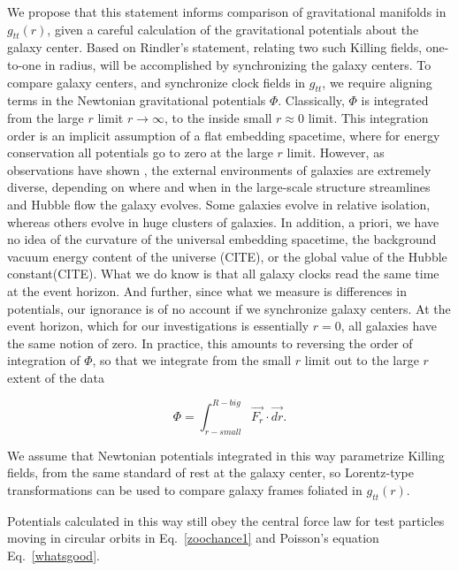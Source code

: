 \documentclass[reprint,%
 amsmath,amssymb,
 aps,
]{revtex4-1}
\begin{document}
 We propose that this  statement informs comparison of gravitational manifolds in $g_{tt}(r)$, given a careful calculation  of the gravitational potentials about the galaxy center. Based on   Rindler's statement, relating two such Killing fields,  one-to-one in radius, will be accomplished  by synchronizing the galaxy centers.  To compare galaxy centers, and  
 synchronize   clock fields   in $g_{tt}$, we   require aligning terms in  the Newtonian  gravitational potentials  $\Phi $. 
 Classically, $\Phi$ is integrated from the large $r$ limit   $r \to \infty$,  to the inside small $r\approx 0$ limit. 
This integration order is an implicit assumption of a flat embedding spacetime, where for   energy conservation all potentials go to zero at the large $r$ limit. 
However,  as observations have shown \cite{Pomarede:2020pme,Hoffman:2017ako}, 
the external environments of galaxies are   extremely   diverse,   depending on where and when  in the large-scale structure streamlines and Hubble flow the galaxy evolves. Some galaxies evolve in relative isolation, whereas others evolve in   huge clusters of galaxies. In addition, a priori,  we have no idea of the curvature of the universal embedding spacetime,  the background vacuum energy content of the universe (CITE), or the  global   value of the Hubble constant(CITE).  What we do know  is that all galaxy clocks read the same time at the event horizon. And further, since
  what we measure    is differences in potentials, our ignorance is of no account if we synchronize galaxy centers. At the event horizon, which for our investigations is essentially $r=0$,  all 
  galaxies have  the same notion of zero. In practice,  this   amounts to reversing the 
    order of integration of $\Phi$, so that  we 
integrate  from the small $r$ limit out  to the large $r$  extent of the data  

 \begin{equation}
     \Phi  =   \int^{R-big}_{r-small} \vec{F_r}\cdot\vec{dr}  . 
      \label{eq:Newt2}
      \end{equation}
 
   We   assume that Newtonian potentials integrated in this way parametrize Killing fields,     from the same standard of rest at the galaxy center, so   Lorentz-type transformations can be used to compare galaxy frames foliated in $g_{tt}(r)$. 
   
     Potentials calculated in this way still obey the central force law for test particles moving in circular orbits in Eq.~\ref{zoochance1} and Poisson's equation Eq.~\ref{whatsgood}.
   
\end{document}
